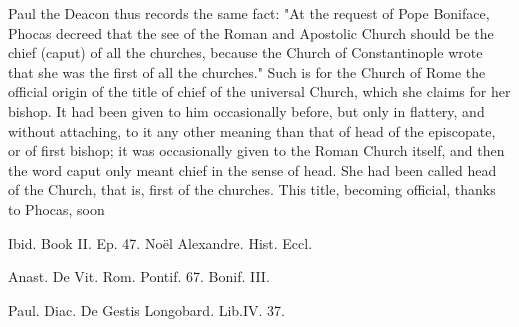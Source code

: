 Paul the Deacon thus records the same fact: "At the request of Pope Boniface, Phocas decreed that the see of the Roman and Apostolic Church should be the chief (caput) of all the churches, because the Church of Constantinople wrote that she was the first of all the churches." Such is for the Church of Rome the official origin of the title of chief of the universal Church, which she claims for her bishop. It had been given to him occasionally before, but only in flattery, and without attaching, to it any other meaning than that of head of the episcopate, or of first bishop; it was occasionally given to the Roman Church itself, and then the word caput only meant chief in the sense of head. She had been called head of the Church, that is, first of the churches. This title, becoming official, thanks to Phocas, soon

Ibid. Book II. Ep. 47. Noël Alexandre. Hist. Eccl.

Anast. De Vit. Rom. Pontif. 67. Bonif. III.

Paul. Diac. De Gestis Longobard. Lib.IV. 37.

